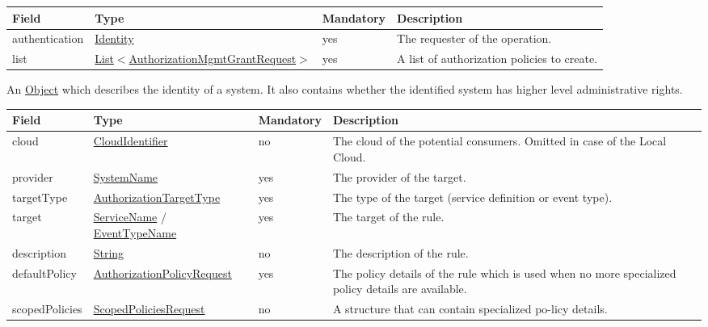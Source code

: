 \documentclass[a4paper]{arrowhead}
\newcommand{\pref}[1]{{\textcolor{ArrowheadGrey}{\hyperref[sec:model:primitives:#1]{#1}}}}
\begin{document}
{}
 
\begin{table}[ht!]
\begin{tabularx}{\textwidth}{| p{3cm} | p{6cm} | p{2cm} | X |} \hline
\rowcolor{gray!33} Field & Type & Mandatory & Description \\ \hline
authentication &\hyperref[sec:model:Identity]{Identity} & yes & The requester of the operation. \\ \hline
list & \pref{List}$<$\hyperref[sec:model:AuthorizationMgmtGrantRequest]{AuthorizationMgmtGrantRequest}$>$ & yes & A list of authorization policies to create. \\ \hline
\end{tabularx}
\end{table}


An \pref{Object} which describes the identity of a system. It also contains whether the identified system has higher level administrative rights.

 
\begin{table}[ht!]
\begin{tabularx}{\textwidth}{| p{3cm} | p{4.5cm} | p{2cm} | X |} \hline
\rowcolor{gray!33} Field & Type & Mandatory & Description \\ \hline
cloud & \pref{CloudIdentifier} & no & The cloud of the potential consumers. Omitted in case of the Local Cloud. \\ \hline
provider & \pref{SystemName} & yes & The provider of the target. \\ \hline 
targetType & \pref{AuthorizationTargetType} & yes & The type of the target (service definition or event type). \\ \hline
target & \pref{ServiceName} / \pref{EventTypeName} & yes & The target of the rule. \\ \hline
description & \pref{String} & no & The description of the rule. \\ \hline
defaultPolicy & \hyperref[sec:model:AuthorizationPolicyRequest]{AuthorizationPolicyRequest} & yes & The policy details of the rule which is used when no more specialized policy details are available. \\ \hline
scopedPolicies & \hyperref[sec:model:ScopedPoliciesRequest]{ScopedPoliciesRequest} & no & A structure that can contain specialized po-licy details. \\ \hline
\end{tabularx}
\end{table}
\end{document}
